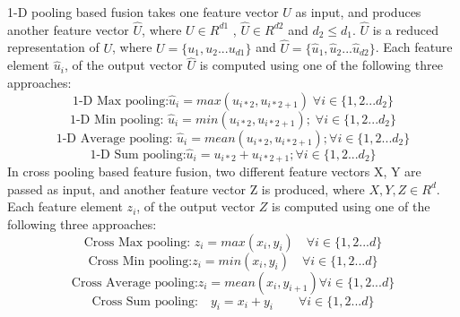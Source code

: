 \documentclass[electronics,article,accept ,moreauthors,pdftex]{mdpi}
\begin{document}
1-D pooling based fusion takes one feature vector $U$ as input, and produces another feature vector $\hat U$, where $U \in R^{d1}$ , $\hat U \in R^{d2}$ and $d_2 \leq d_1 $. $\hat U$ is a reduced representation of $U$, where $U = \{u_1,u_2...u_{d1} \}$ and  $\hat U = \{\hat u_1,\hat u_2...\hat u_{d2} \}$. 
Each feature element $\hat u_i$, of the output vector $\hat U $ is computed using one of the following three approaches:
\begin{equation}
\text{1-D Max pooling:} \hat u_i = max(u_{i*2},u_{i*2 + 1}) \; \forall i \in \{1,2...d_2\}
\end{equation}
\begin{equation}
\text{1-D Min pooling: } \hat u_i = min(u_{i*2},u_{i*2 + 1}); \; \forall i \in \{1,2...d_2\}
\end{equation}
\begin{equation}
\text{1-D Average pooling: }  \hat u_i = mean(u_{i*2},u_{i*2 + 1}); \forall i \in \{1,2...d_2\}    
\end{equation}
\begin{equation}
\text{1-D Sum pooling:}  \hat u_i = u_{i*2} + u_{i*2 +1}; \forall i \in \{1,2...d_2\}
\end{equation}
In cross pooling based feature fusion, two different feature vectors X, Y are passed as input, and  another feature vector Z is produced, where ${X,Y,Z} \in R^{d}$. Each feature element $z_i$, of the output vector $Z$ is computed using one of the following three approaches:
\begin{equation}
\text{Cross Max pooling: } z_i = max(x_i,y_i) \quad \forall i \in \{1,2...d\}
\end{equation}
\begin{equation}
\text{Cross Min pooling:} z_i = min(x_i,y_i) \quad \forall i \in \{1,2...d\}
\end{equation}
\begin{equation}
\text{Cross Average pooling:} z_i = mean(x_i,y_{i+1}) \forall i \in \{1,2...d\}
\end{equation}
\begin{equation}
\text{Cross Sum pooling:}\quad  y_i = x_{i} + y_{i}\qquad \forall i \in \{1,2...d\}
\end{equation}
\end{document}
